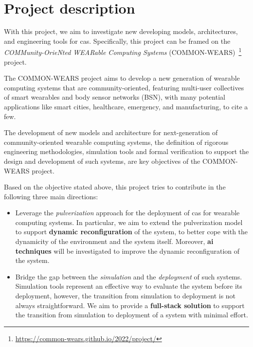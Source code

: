 \documentclass[12pt]{article}
\newcommand{\meta}[1]{{\color{blue}#1}}
\begin{document}
\section{Project description}\label{sec:project-description}
\meta{
With this project,
we aim to investigate new developing models,
architectures,
and engineering tools for \ac{cas}.
%
Specifically,
this project can be framed on the \emph{COMMunity-OrieNted WEARable Computing Systems} (COMMON-WEARS)~\footnote{\url{https://common-wears.github.io/2022/project/}} project.

The COMMON-WEARS project aims to develop a new generation of wearable computing systems that are community-oriented,
featuring multi-user collectives of smart wearables and body sensor networks (BSN),
with many potential applications like smart cities,
healthcare,
emergency,
and manufacturing, to cite a few.

The development of new models and architecture for next-generation of community-oriented wearable computing systems,
the definition of rigorous engineering methodologies,
simulation tools and formal verification to support the design and development of such systems,
are key objectives of the COMMON-WEARS project.

Based on the objective stated above,
this project tries to contribute in the following three main directions:

\begin{itemize}
	\item Leverage the \emph{pulverization} approach for the deployment of \ac{cas} for wearable computing systems.
		In particular,
		we aim to extend the pulverization model to support \textbf{dynamic reconfiguration} of the system,
		to better cope with the dynamicity of the environment and the system itself.
		Moreover, \textbf{\ac{ai} techniques} will be investigated to improve the dynamic reconfiguration of the system.

	\item Bridge the gap between the \emph{simulation} and the \emph{deployment} of such systems.
		Simulation tools represent an effective way to evaluate the system before its deployment,
		however,
		the transition from simulation to deployment is not always straightforward.
		We aim to provide a \textbf{full-stack solution} to support the transition from simulation to deployment of a system with minimal effort.
	

\end{itemize}}
\end{document}
